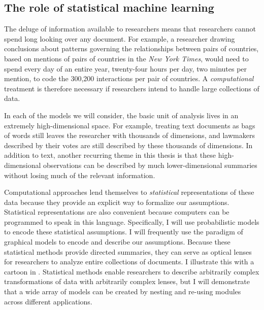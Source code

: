 \subsection*{The role of statistical machine learning}

The deluge of information available to researchers means that
researchers cannot spend long looking over any document.  For example,
a researcher drawing conclusions about patterns governing the
relationships between pairs of countries, based on mentions of pairs
of countries in the \emph{New York Times}, would need to spend every
day of an entire year, twenty-four hours per day, two minutes per
mention, to code the 300,200 interactions per pair of countries.  A
\emph{computational} treatment is therefore necessary if researchers
intend to handle large collections of data.

In each of the models we will consider, the basic unit of analysis
lives in an extremely high-dimensional space.  For example, treating
text documents as bags of words still leaves the researcher with
thousands of dimensions, and lawmakers described by their votes are
still described by these thousands of
dimensions.%
In addition to text, another recurring theme in this thesis is that
these high-dimensional observations can be described by much
lower-dimensional summaries without losing much of the relevant
information.

Computational approaches lend themselves to \emph{statistical}
representations of these data because they provide an explicit way to
formalize our assumptions.  Statistical representations are also
convenient because computers can be programmed to speak in this
language. Specifically, I will use probabilistic models to encode
these statistical assumptions.  I will frequently use the paradigm of
graphical models \cite{pearl:1985} to encode and describe our
assumptions.  Because these statistical methods provide directed
summaries, they can serve as optical lenses for researchers to analyze
entire collections of documents.  I illustrate this with a cartoon in
.  Statistical methods enable researchers to
describe arbitrarily complex transformations of data with arbitrarily
complex lenses, but I will demonstrate that a wide array of models can
be created by nesting and re-using modules across different
applications.

